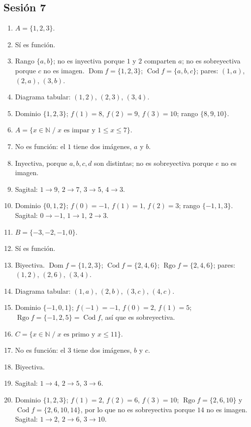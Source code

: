 \documentclass[12pt, letterpaper]{article}
\newcommand{\N}{\mathbb{N}}
\begin{document}
\subsection*{Sesión 7}
\begin{enumerate}[leftmargin=*, label=\textbf{\arabic*.}]
  \item $A=\{1,2,3\}$.
  \item Sí es función.
  \item Rango $\{a,b\}$; no es inyectiva porque $1$ y $2$ comparten $a$; no es sobreyectiva porque $c$ no es imagen. $\operatorname{Dom} f=\{1,2,3\}$; $\operatorname{Cod} f=\{a,b,c\}$; pares: $(1,a)$, $(2,a)$, $(3,b)$.
  \item Diagrama tabular: $(1,2)$, $(2,3)$, $(3,4)$.
  \item Dominio $\{1,2,3\}$; $f(1)=8$, $f(2)=9$, $f(3)=10$; rango $\{8,9,10\}$.
  \item $A=\{x\in\N \;/\; x \text{ es impar y } 1\le x\le 7\}$.
  \item No es función: el $1$ tiene dos imágenes, $a$ y $b$.
  \item Inyectiva, porque $a,b,c,d$ son distintas; no es sobreyectiva porque $e$ no es imagen.
  \item Sagital: $1\to9$, $2\to7$, $3\to5$, $4\to3$.
  \item Dominio $\{0,1,2\}$; $f(0)=-1$, $f(1)=1$, $f(2)=3$; rango $\{-1,1,3\}$. Sagital: $0\to-1$, $1\to1$, $2\to3$.
  \item $B=\{-3,-2,-1,0\}$.
  \item Sí es función.
  \item Biyectiva. $\operatorname{Dom} f=\{1,2,3\}$; $\operatorname{Cod} f=\{2,4,6\}$; $\operatorname{Rgo} f=\{2,4,6\}$; pares: $(1,2)$, $(2,6)$, $(3,4)$.
  \item Diagrama tabular: $(1,a)$, $(2,b)$, $(3,c)$, $(4,c)$.
  \item Dominio $\{-1,0,1\}$; $f(-1)=-1$, $f(0)=2$, $f(1)=5$; $\operatorname{Rgo} f=\{-1,2,5\}=\operatorname{Cod} f$, así que es sobreyectiva.
  \item $C=\{x\in\N \;/\; x \text{ es primo y } x\le 11\}$.
  \item No es función: el $3$ tiene dos imágenes, $b$ y $c$.
  \item Biyectiva.
  \item Sagital: $1\to4$, $2\to5$, $3\to6$.
  \item Dominio $\{1,2,3\}$; $f(1)=2$, $f(2)=6$, $f(3)=10$; $\operatorname{Rgo} f=\{2,6,10\}$ y $\operatorname{Cod} f=\{2,6,10,14\}$, por lo que no es sobreyectiva porque $14$ no es imagen. Sagital: $1\to2$, $2\to6$, $3\to10$.
\end{enumerate}
\end{document}
